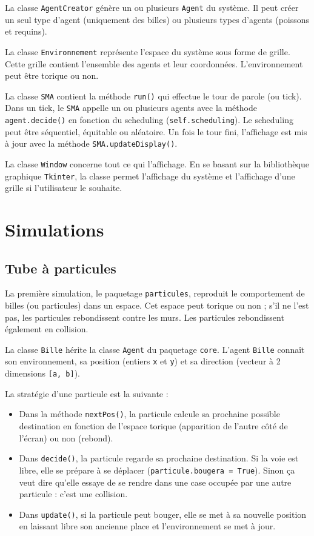 \documentclass[a4paper]{article}
\begin{document}
\medskip
La classe \texttt{AgentCreator} génère un ou plusieurs \texttt{Agent} du système. Il peut créer un seul type d'agent (uniquement des billes) ou plusieurs types d'agents (poissons et requins).

\medskip
La classe \texttt{Environnement} représente l'espace du système sous forme de grille. Cette grille contient l'ensemble des agents et leur coordonnées. L'environnement peut être torique ou non. 

\medskip
La classe \texttt{SMA} contient la méthode \texttt{run()} qui effectue le tour de parole (ou tick). Dans un tick, le \texttt{SMA} appelle un ou plusieurs agents avec la méthode \texttt{agent.decide()} en fonction du scheduling (\texttt{self.scheduling}). Le scheduling peut être séquentiel, équitable ou aléatoire. Un fois le tour fini, l'affichage est mis à jour avec la méthode \texttt{SMA.updateDisplay()}.

\medskip
La classe \texttt{Window} concerne tout ce qui l'affichage. En se basant sur la bibliothèque graphique \texttt{Tkinter}, la classe permet l'affichage du système et l'affichage d'une grille si l'utilisateur le souhaite.

\section{Simulations}

\subsection{Tube à particules}

La première simulation, le paquetage \texttt{particules}, reproduit le comportement de billes (ou particules) dans un espace. Cet espace peut torique ou non ; s'il ne l'est pas, les particules rebondissent contre les murs. Les particules rebondissent également en collision.

\medskip
La classe \texttt{Bille} hérite la classe \texttt{Agent} du paquetage \texttt{core}. L'agent \texttt{Bille} connaît son environnement, sa position (entiers \texttt{x} et \texttt{y}) et sa direction (vecteur à 2 dimensions \texttt{[a, b]}).

\medskip
La stratégie d'une particule est la suivante :
\begin{itemize}
\item Dans la méthode \texttt{nextPos()}, la particule calcule sa prochaine possible destination en fonction de l'espace torique (apparition de \og l'autre côté \fg{} de l'écran) ou non (rebond).
\item Dans \texttt{decide()}, la particule regarde sa prochaine destination. Si la voie est libre, elle se prépare à se déplacer (\texttt{particule.bougera = True}). Sinon ça veut dire qu'elle essaye de se rendre dans une case occupée par une autre particule : c'est une collision.
\item Dans \texttt{update()}, si la particule peut bouger, elle se met à sa nouvelle position en laissant libre son ancienne place et l'environnement se met à jour.
\end{itemize}
\end{document}
